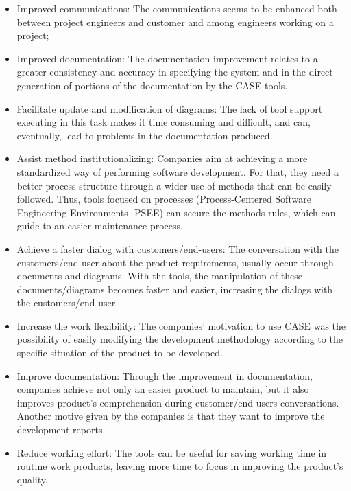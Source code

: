\begin{itemize}
\item Improved communications: The communications seems to be enhanced both between project engineers and customer and among engineers working on a project;
 \item Improved documentation: The documentation improvement relates to a greater consistency and accuracy in specifying the system and in the direct generation of portions of the documentation by the CASE tools.
\item Facilitate update and modification of diagrams: The lack of tool support executing in this task makes it time consuming and difficult, and can, eventually, lead to problems in the documentation produced.
\item Assist method institutionalizing: Companies aim at achieving a more standardized way of performing software development. For that, they need a better process structure through a wider use of methods that can be easily followed. Thus, tools focused on processes (Process-Centered Software Engineering Environments -PSEE) can secure the methods rules, which can guide to an easier maintenance process.
\item Achieve a faster dialog with customers/end-users: The conversation with the customers/end-user about the product requirements, usually occur through documents and diagrams. With the tools, the manipulation of these documents/diagrams becomes faster and easier, increasing the dialogs with the customers/end-user. 

\item  Increase the work flexibility: The companies’ motivation to use CASE was the possibility of easily modifying the development methodology according to the specific situation of the product to be developed.

\item  Improve documentation: Through the improvement in documentation, companies achieve not only an easier product to maintain, but it also improves product's comprehension during customer/end-users conversations. Another motive given by the companies is that they want to improve the development reports.

\item  Reduce working effort: The tools can be useful for saving working time in routine work products, leaving more time to focus in improving the product's quality.

\end{itemize}



